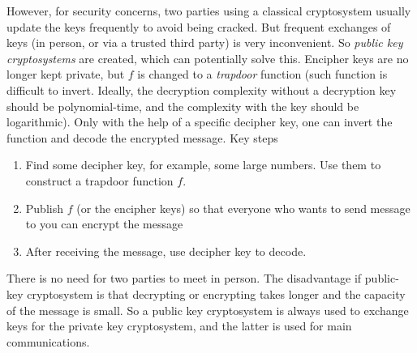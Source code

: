 \documentclass[12pt]{article}
\theoremstyle{remark}
\theoremstyle{definition}
\begin{document}
    However, for security concerns, two parties using a classical cryptosystem usually update the keys frequently to avoid being cracked. But frequent exchanges of keys (in person, or via a trusted third party) is very inconvenient. So \textit{public key cryptosystems} are created, which can potentially solve this. Encipher keys are no longer kept private, but $f$ is changed to a \textit{trapdoor} function (such function is difficult to invert. Ideally, the decryption complexity without a decryption key should be polynomial-time, and the complexity with the key should be logarithmic). Only with the help of a specific decipher key, one can invert the function and decode the encrypted message. Key steps
    \begin{enumerate}
        \setlength\itemsep{0.2em}
        \item Find some decipher key, for example, some large numbers. Use them to construct a trapdoor function $f$. 
        \item Publish $f$ (or the encipher keys) so that everyone who wants to send message to you can encrypt the message
        \item After receiving the message, use decipher key to decode. 
    \end{enumerate}
    There is no need for two parties to meet in person. The disadvantage if public-key cryptosystem is that decrypting or encrypting takes longer and the capacity of the message is small. So a public key cryptosystem is always used to exchange keys for the private key cryptosystem, and the latter is used for main communications. 
\end{document}
